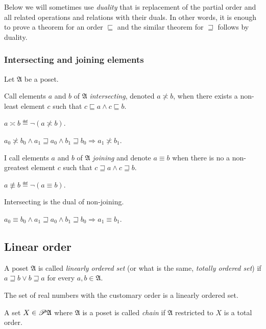Below we will sometimes use \emph{duality}
that is replacement of the partial order and all related operations
and relations with their duals. In other words, it is enough to prove
a theorem for an order $\sqsubseteq$ and the similar theorem for
$\sqsupseteq$ follows by duality.


\subsubsection{Intersecting and joining elements}

Let $\mathfrak{A}$ be a poset.
\begin{defn}
Call elements $a$ and $b$ of $\mathfrak{A}$
\emph{intersecting}, denoted $a\nasymp b$, when there exists a non-least
element $c$ such that $c\sqsubseteq a\land c\sqsubseteq b$.
\end{defn}

\begin{defn}
$a\asymp b\eqdef\lnot(a\nasymp b)$.\end{defn}
\begin{obvious}
$a_{0}\nasymp b_{0}\land a_{1}\sqsupseteq a_{0}\land b_{1}\sqsupseteq b_{0}\Rightarrow a_{1}\nasymp b_{1}$.\end{obvious}
\begin{defn}
I call elements $a$ and $b$ of $\mathfrak{A}$
\emph{joining} and denote $a\equiv b$ when there is no a non-greatest
element $c$ such that $c\sqsupseteq a\land c\sqsupseteq b$.
\end{defn}

\begin{defn}
$a\nequiv b\eqdef\lnot(a\equiv b)$.\end{defn}
\begin{obvious}
Intersecting is the dual of non-joining.
\end{obvious}

\begin{obvious}
$a_{0}\equiv b_{0}\land a_{1}\sqsupseteq a_{0}\land b_{1}\sqsupseteq b_{0}\Rightarrow a_{1}\equiv b_{1}$.
\end{obvious}

\subsection{Linear order}
\begin{defn}
A poset $\mathfrak{A}$ is called \emph{linearly
ordered set} (or what is the same, \emph{totally ordered set}) if
$a\sqsupseteq b\lor b\sqsupseteq a$ for every $a,b\in\mathfrak{A}$.\end{defn}
\begin{example}
The set of real numbers with the customary order is a linearly ordered
set.\end{example}
\begin{defn}
A set $X\in\mathscr{P}\mathfrak{A}$ where $\mathfrak{A}$
is a poset is called \emph{chain} if $\mathfrak{A}$ restricted to
$X$ is a total order.
\end{defn}

